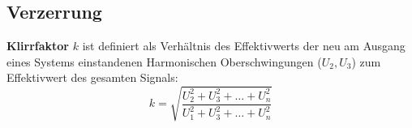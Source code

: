 \subsection{Verzerrung}
\textbf{Klirrfaktor} $k$ ist definiert als Verhältnis des Effektivwerts der neu am Ausgang eines Systems einstandenen Harmonischen Oberschwingungen ($U_2, U_3$) zum Effektivwert des gesamten Signals:
\[
k = \sqrt{\frac{U^2_2 + U^2_3 + \dots + U_n^2}{U^2_1 + U^2_3 + \dots + U_n^2}}
\]
